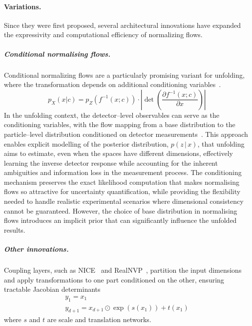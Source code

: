         \paragraph{Variations.}
            Since they were first proposed, several architectural innovations have expanded the expressivity and computational efficiency of normalizing flows.
            
            \subparagraph[Conditional normalising flows]{Conditional normalising flows.}
            \label{subpar:conditional-nfs}
                Conditional normalizing flows are a particularly promising variant for unfolding, where the transformation depends on additional conditioning variables~\cite{Winkler2019LearningFlows}.
                \begin{equation}
                    p_X(x|c) = p_Z(f^{-1}(x; c)) \cdot \left|\det\left(\frac{\partial f^{-1}(x; c)}{\partial x}\right)\right|
                \end{equation}
                In the unfolding context, the detector--level observables can serve as the conditioning variables, with the flow mapping from a base distribution to the particle--level distribution conditioned on detector measurements~\cite{Vischia2020NewUnfolding, Algren2023FlowReweighting}.
                This approach enables explicit modelling of the posterior distribution,
                \(p(z\, |\, x)\), that unfolding aims to estimate, even when the spaces have different dimensions, effectively learning the inverse detector response while accounting for the inherent ambiguities and information loss in the measurement process.
                The conditioning mechanism preserves the exact likelihood computation that makes normalising flows so attractive for uncertainty quantification, while providing the flexibility needed to handle realistic experimental scenarios where dimensional consistency cannot be guaranteed.
                However, the choice of base distribution in normalising flows introduces an implicit prior that can significantly influence the unfolded results.
            \subparagraph{Other innovations.}
                Coupling layers, such as NICE~\cite{dinh_nice_2015} and RealNVP~\cite{dinh_density_2017}, partition the input dimensions and apply transformations to one part conditioned on the other, ensuring tractable Jacobian determinants
                \begin{gather}
                    y_{1} = x_{1} \\
                    y_{d+1} = x_{d+1} \odot \exp(s(x_{1})) + t(x_{1})
                \end{gather}
                where \(s\) and \(t\) are scale and translation networks.
    
